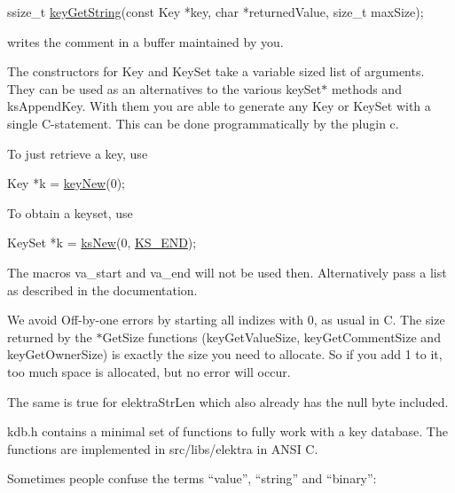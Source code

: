 \begin{DoxyCode}
ssize\_t \hyperlink{group__keyvalue_ga41b9fac5ccddafe407fc0ae1e2eb8778}{keyGetString}(\textcolor{keyword}{const} Key *key, \textcolor{keywordtype}{char} *returnedValue, \textcolor{keywordtype}{size\_t} maxSize);
\end{DoxyCode}


writes the comment in a buffer maintained by you.

The constructors for {\ttfamily Key} and {\ttfamily Key\+Set} take a variable sized list of arguments. They can be used as an alternatives to the various {\ttfamily key\+Set$\ast$} methods and {\ttfamily ks\+Append\+Key}. With them you are able to generate any {\ttfamily Key} or {\ttfamily Key\+Set} with a single C-\/statement. This can be done programmatically by the plugin {\ttfamily c}.

To just retrieve a key, use


\begin{DoxyCode}
Key *k = \hyperlink{group__key_gad23c65b44bf48d773759e1f9a4d43b89}{keyNew}(0);
\end{DoxyCode}


To obtain a {\ttfamily keyset}, use


\begin{DoxyCode}
KeySet *k = \hyperlink{group__keyset_ga671e1aaee3ae9dc13b4834a4ddbd2c3c}{ksNew}(0, \hyperlink{group__keyset_ga7a28fce3773b2c873c94ac80b8b4cd54}{KS\_END});
\end{DoxyCode}


The macros {\ttfamily va\+\_\+start} and {\ttfamily va\+\_\+end} will not be used then. Alternatively pass a list as described in the documentation.

We avoid Off-\/by-\/one errors by starting all indizes with 0, as usual in C. The size returned by the {\ttfamily $\ast$\+Get\+Size} functions ({\ttfamily key\+Get\+Value\+Size}, {\ttfamily key\+Get\+Comment\+Size} and {\ttfamily key\+Get\+Owner\+Size}) is exactly the size you need to allocate. So if you add 1 to it, too much space is allocated, but no error will occur.

The same is true for {\ttfamily elektra\+Str\+Len} which also already has the null byte included.

{\ttfamily kdb.\+h} contains a minimal set of functions to fully work with a key database. The functions are implemented in {\ttfamily src/libs/elektra} in A\+N\+SI C.

Sometimes people confuse the terms “value”, “string” and “binary”\+:


